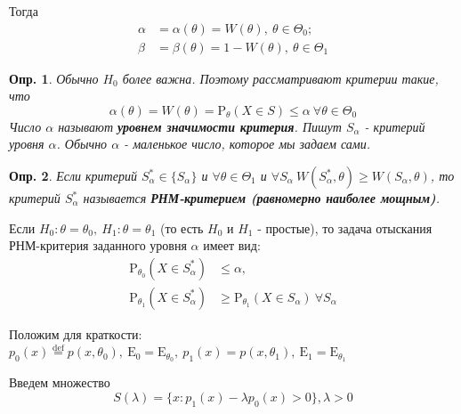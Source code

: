 \documentclass[12pt]{article}
\newtheorem{definition}{Опр.}
\theoremstyle{basic_theorem}
\theoremstyle{name_theorem}
\newcommand\defin[1]{\textbf{#1}}
\newcommand*{\defeq}{\stackrel{\text{def}}{=}}
\def\E{ \mathrm{E} }
\def\P{ \mathrm{P} }
\begin{document}
Тогда
\begin{align*}
    \alpha &= \alpha(\theta) = W(\theta),\ \theta\in\Theta_0; \\
    \beta  &= \beta(\theta) = 1 - W(\theta),\ \theta\in\Theta_1
\end{align*}

\begin{definition}
Обычно \(H_0\) более важна. Поэтому рассматривают критерии
такие, что
\[\alpha(\theta) = W(\theta) = \P_{\theta}(X\in S) \leq\alpha \ \forall \theta\in\Theta_0\]
    Число \(\alpha\) называют \defin{уровнем значимости критерия}.
    Пишут \(S_\alpha\) - критерий уровня \(\alpha\). Обычно \(\alpha\) -
    маленькое число, которое мы задаем сами.
\end{definition}

\begin{definition}
    Если критерий \(S^*_\alpha \in \{S_\alpha\}\) и \(\forall\theta\in\Theta_1\) и
    \(\forall S_\alpha \ W(S^*_\alpha,\theta) \geq W(S_\alpha, \theta)\),
    то критерий \(S^*_\alpha\) называется \defin{РНМ-критерием (равномерно наиболее мощным)}.
\end{definition}

Если \(H_0:\theta = \theta_0,\ H_1:\theta = \theta_1\) (то есть
\(H_0\) и \(H_1\) - простые), то задача отыскания РНМ-критерия
заданного уровня \(\alpha\) имеет вид:
\begin{align*}
  \P_{\theta_0}(X\in S^*_\alpha) &\leq \alpha, \\
  \P_{\theta_1}(X\in S^*_\alpha) &\geq \P_{\theta_1}(X\in S_\alpha) \ \forall S_\alpha
\end{align*}

Положим для краткости:
\(p_0(x)\defeq p(x, \theta_0),\ \E_0 = \E_{\theta_0},\ p_{1}(x) = p(x, \theta_1),\ \E_1 = \E_{\theta_1}\)

Введем множество
\[S(\lambda) = \{x: p_1(x) - \lambda p_0(x) > 0\}, \lambda > 0\]
\end{document}
